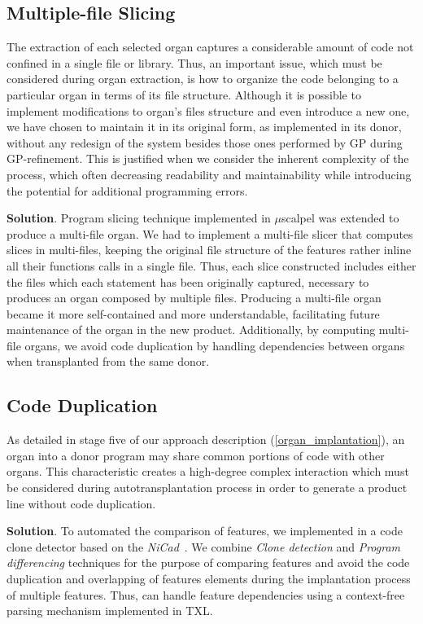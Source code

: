 \subsection{Multiple-file Slicing} 
    
The extraction of each selected organ captures a considerable amount of code not confined in a single file or library. Thus, an important issue, which must be considered during organ extraction, is how to organize the code belonging to a particular organ in terms of its file structure. Although it is possible to implement modifications to organ's files structure and even introduce a new one, we have chosen to maintain it in its original form, as implemented in its donor, without any redesign of the system besides those ones performed by GP during GP-refinement. This is justified when we consider the inherent complexity of the process, which often decreasing readability and maintainability while introducing the potential for additional programming errors. 

\textbf{Solution}. Program slicing technique implemented in $\mu$scalpel was extended to produce a multi-file organ. We had to implement a multi-file slicer that computes slices in multi-files, keeping the original file structure of the features rather inline all their functions calls in a single file. Thus, each slice constructed includes either the files which each statement has been originally captured, necessary to produces an organ composed by multiple files. Producing a multi-file organ became it more self-contained and more understandable, facilitating future maintenance of the organ in the new product. Additionally, by computing multi-file organs, we avoid code duplication by handling dependencies between organs when transplanted from the same donor.

\subsection{Code Duplication} 

As detailed in stage five of our approach description (\ref{organ_implantation}), an organ into a donor program may share common portions of code with other organs. This characteristic creates a high-degree complex interaction which must be considered during autotransplantation process in order to generate a product line without code duplication.

\textbf{Solution}. To automated the comparison of features, we implemented in \autoscalpel a code clone detector based on the \emph{NiCad}~\cite{Roy2009}. We combine \emph{Clone detection} and \emph{Program differencing} techniques for the purpose of comparing features and avoid the code duplication and overlapping of features elements during the implantation process of multiple features. Thus, \autoscalpel can handle feature dependencies using a context-free parsing mechanism implemented in TXL. 


